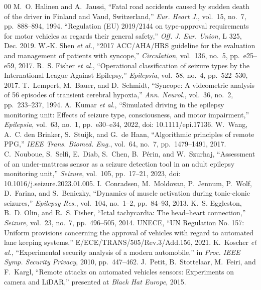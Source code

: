 \documentclass[conference]{IEEEtran}
\begin{document}
\begin{thebibliography}{00}
 M.~O. Halinen and A.~Jaussi, ``Fatal road accidents caused by sudden death of the driver in Finland and Vaud, Switzerland,'' \emph{Eur. Heart J.}, vol.~15, no.~7, pp.~888--894, 1994.
 ``Regulation (EU) 2019/2144 on type-approval requirements for motor vehicles as regards their general safety,'' \emph{Off. J. Eur. Union}, L 325, Dec. 2019.
 W.-K. Shen \emph{et al.}, ``2017 ACC/AHA/HRS guideline for the evaluation and management of patients with syncope,'' \emph{Circulation}, vol.~136, no.~5, pp.~e25--e59, 2017.
 R.~S. Fisher \emph{et al.}, ``Operational classification of seizure types by the International League Against Epilepsy,'' \emph{Epilepsia}, vol.~58, no.~4, pp.~522--530, 2017.
 T.~Lempert, M.~Bauer, and D.~Schmidt, ``Syncope: A videometric analysis of 56 episodes of transient cerebral hypoxia,'' \emph{Ann. Neurol.}, vol.~36, no.~2, pp.~233--237, 1994.
 A.~Kumar \emph{et al.}, ``Simulated driving in the epilepsy monitoring unit: Effects of seizure type, consciousness, and motor impairment,'' \emph{Epilepsia}, vol.~63, no.~1, pp.~e30--e34, 2022, doi: 10.1111/epi.17136.
 W.~Wang, A.~C. den Brinker, S.~Stuijk, and G.~de Haan, ``Algorithmic principles of remote PPG,'' \emph{IEEE Trans. Biomed. Eng.}, vol.~64, no.~7, pp.~1479--1491, 2017.
 C.~Nouboue, S.~Selfi, E.~Diab, S.~Chen, B.~P\'erin, and W.~Szurhaj, ``Assessment of an under-mattress sensor as a seizure detection tool in an adult epilepsy monitoring unit,'' \emph{Seizure}, vol.~105, pp.~17--21, 2023, doi: 10.1016/j.seizure.2023.01.005.
 I.~Conradsen, M.~Moldovan, P.~Jennum, P.~Wolf, D.~Farina, and S.~Beniczky, ``Dynamics of muscle activation during tonic-clonic seizures,'' \emph{Epilepsy Res.}, vol.~104, no.~1--2, pp.~84--93, 2013.
 K.~S. Eggleston, B.~D. Olin, and R.~S. Fisher, ``Ictal tachycardia: The head--heart connection,'' \emph{Seizure}, vol.~23, no.~7, pp.~496--505, 2014.
 UNECE, ``UN Regulation No. 157: Uniform provisions concerning the approval of vehicles with regard to automated lane keeping systems,'' E/ECE/TRANS/505/Rev.3/Add.156, 2021.
 K.~Koscher \emph{et al.}, ``Experimental security analysis of a modern automobile,'' in \emph{Proc. IEEE Symp. Security Privacy}, 2010, pp.~447--462.
 J.~Petit, B.~Stottelaar, M.~Feiri, and F.~Kargl, ``Remote attacks on automated vehicles sensors: Experiments on camera and LiDAR,'' presented at \emph{Black Hat Europe}, 2015.

\end{thebibliography}
\end{document}

